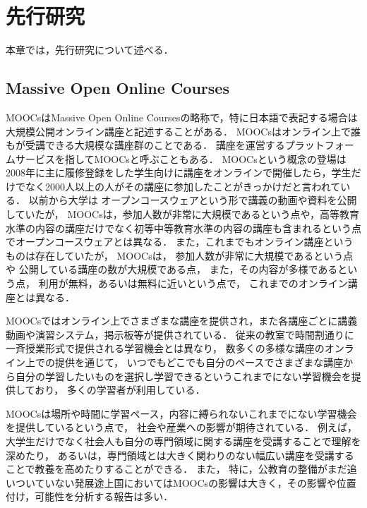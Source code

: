 \chapter{先行研究}
\label{chap:previous}
\fancyhf{}
\rhead{\thepage}
\cfoot{\thepage}

本章では，先行研究について述べる．





\section{Massive Open Online Courses}
MOOCsはMassive Open Online Courses\cite{mcauley2010mooc, pappano2012year,siemens2013massive}の略称で，特に日本語で表記する場合は大規模公開オンライン講座と記述することがある．
MOOCsはオンライン上で誰もが受講できる大規模な講座群のことである．
講座を運営するプラットフォームサービスを指してMOOCsと呼ぶこともある．
MOOCsという概念の登場は2008年に主に履修登録をした学生向けに講座をオンラインで開催したら，学生だけでなく2000人以上の人がその講座に参加したことがきっかけだと言われている\cite{yuan2013moocs}．
以前から大学は
オープンコースウェア\cite{abelson2008creation}という形で講義の動画や資料を公開していたが，
MOOCsは，参加人数が非常に大規模であるという点や，高等教育水準の内容の講座だけでなく初等中等教育水準の内容の講座も含まれるという点でオープンコースウェアとは異なる．
また，これまでもオンライン講座というものは存在していたが，
MOOCsは，
参加人数が非常に大規模であるという点や
公開している講座の数が大規模である点，
また，その内容が多様であるという点，
利用が無料，あるいは無料に近いという点で，
これまでのオンライン講座とは異なる．

MOOCsではオンライン上でさまざまな講座を提供され，また各講座ごとに講義動画や演習システム，掲示板等が提供されている．
従来の教室で時間割通りに一斉授業形式で提供される学習機会とは異なり，
数多くの多様な講座のオンライン上での提供を通じて，
いつでもどこでも自分のペースでさまざまな講座から自分の学習したいものを選択し学習できるというこれまでにない学習機会を提供しており，
多くの学習者が利用している．

MOOCsは場所や時間に学習ペース，内容に縛られないこれまでにない学習機会を提供しているという点で，
社会や産業への影響が期待されている．
例えば，大学生だけでなく社会人も自分の専門領域に関する講座を受講することで理解を深めたり，
あるいは，専門領域とは大きく関わりのない幅広い講座を受講することで教養を高めたりすることができる．
また，
特に，公教育の整備がまだ追いついていない発展途上国においてはMOOCsの影響は大きく，その影響や位置付け，可能性を分析する報告は多い\cite{trucano2013more,liyanagunawardena2013impact}．

